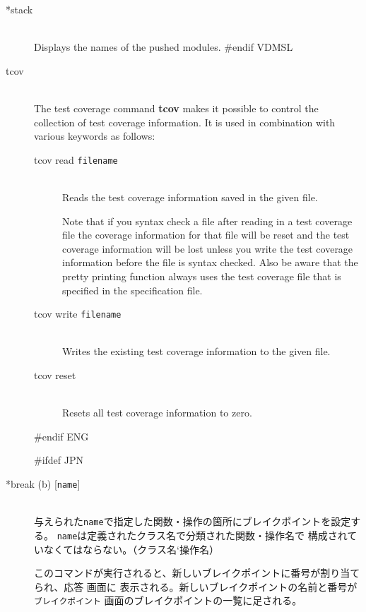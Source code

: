 \documentclass[\pformat,12pt]{article}
\newcommand{\guicmd}[1]{{\sf #1}}
\newcommand{\guicmd}[1]{{\gt #1}}
\begin{document}
\begin{description}
\item[*stack]\mbox{}\\
  Displays the names of the pushed modules.
#endif VDMSL

\item[tcov]\mbox{}\\
The test coverage command {\bf tcov} makes it possible to control 
the collection of test coverage information. It is used in combination 
with various keywords as follows:

\begin{description}
\item[tcov read \mbox{\texttt{filename}}] \mbox{}\\ 
  Reads the test coverage information saved in the given file.
  
  Note that if you syntax check a file after reading in a test coverage 
  file the coverage information for that file will be reset and the test coverage
  information will be lost unless you  write the test coverage information
  before the file is syntax checked.
  Also be aware that the pretty printing function always uses the test coverage
  file that is specified in the specification file.

\item[tcov write \mbox{\texttt{filename}}] \mbox{} \\ 
  Writes the existing test coverage information to the given file.
  
\item[tcov reset] \mbox{} \\
  Resets all test coverage information to zero.
  
\end{description}
#endif ENG

#ifdef JPN
\item[*break (b) \mbox{[{\tt name}]}] 
\mbox{}\\
  与えられた{\tt name}で指定した関数・操作の箇所にブレイクポイントを設定する。
%
{%
{\tt name}は定義されたクラス名で分類された関数・操作名で
構成されていなくてはならない。（クラス名`操作名）
}%
{%
}

  このコマンドが実行されると、新しいブレイクポイントに番号が割り当てられ、\guicmd{応答} 画面に
  表示される。新しいブレイクポイントの名前と番号が \texttt{ブレイクポイント} 画面のブレイクポイントの一覧に足される。


\end{description}
\end{document}
